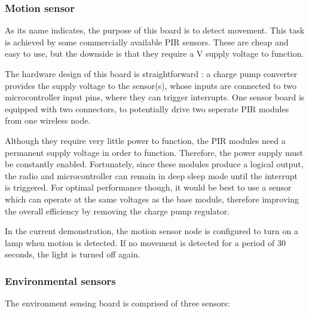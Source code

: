 \subsubsection{Motion sensor}


As its name indicates, the purpose of this board is to detect movement. This
task is achieved by some commercially available PIR sensors. These are cheap and
easy to use, but the downside is that they require a \unit[5]{V} supply voltage
to function.

The hardware design of this board is straightforward : a charge pump converter
provides the supply voltage to the sensor(s), whose inputs are connected to two
microcontroller input pins, where they can trigger interrupts. One sensor board
is equipped with two connectors, to potentially drive two seperate PIR modules
from one wireless node.



Although they require very little power to function, the PIR modules need a
permanent supply voltage in order to function. Therefore, the power supply must
be constantly enabled. Fortunately, since these modules produce a logical
output, the radio and microcontroller can remain in deep sleep mode until the
interrupt is triggered. For optimal performance though, it would be best to use
a sensor which can operate at the same voltages as the base module, therefore
improving the overall efficiency by removing the charge pump regulator.


In the current demonstration, the motion sensor node is configured to turn on a
lamp when motion is detected. If no movement is detected for a period of 30
seconds, the light is turned off again.


\subsubsection{Environmental sensors}

The environment sensing board is comprised of three sensors:



